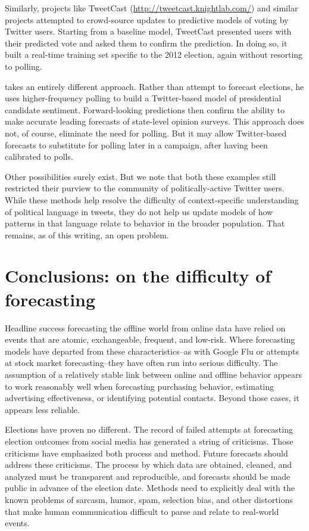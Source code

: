 \documentclass{article}
\begin{document}
Similarly, projects like TweetCast (\url{http://tweetcast.knightlab.com/}) and
similar projects attempted to crowd-source updates to predictive
models of voting by Twitter users. Starting from a baseline model,
TweetCast presented users with their predicted vote and asked them to
confirm the prediction. In doing so, it built a real-time training set
specific to the 2012 election, again without resorting to polling. 

\cite{beauchamp2013} takes an entirely different approach. Rather than
attempt to forecast elections, he uses higher-frequency polling to
build a Twitter-based model of presidential candidate
sentiment. Forward-looking predictions then confirm the ability to
make accurate leading forecasts of state-level opinion surveys. This
approach does not, of course, eliminate the need for polling. But it
may allow Twitter-based forecasts to substitute for polling later in a
campaign, after having been calibrated to polls. 

Other possibilities surely exist. But we note that both these examples
still restricted their purview to the community of politically-active
Twitter users. While these methods help resolve the difficulty of
context-specific understanding of political language in tweets, they
do not help us update models of how patterns in that language relate
to behavior in the broader population. That remains, as of
this writing, an open problem.

\section{Conclusions: on the difficulty of forecasting}
\label{sec:concl-diff-forec}

Headline success forecasting the offline world from online data have
relied on events that are atomic, exchangeable, frequent, and
low-risk. Where forecasting models have departed from these
characteristics--as with Google Flu or attempts at stock market
forecasting--they have often run into serious difficulty. The
assumption of a relatively stable link between online and offline
behavior appears to work reasonably well when forecasting purchasing
behavior, estimating advertising effectiveness, or identifying
potential contacts. Beyond those cases, it appears less reliable.

Elections have proven no different. The record of failed attempts at
forecasting election outcomes from social media has generated a string
of criticisms. Those criticisms have emphasized both process and
method. Future forecasts should address these criticisms. The process
by which data are obtained, cleaned, and analyzed must be transparent
and reproducible, and forecasts should be made public in advance of
the election date. Methods need to explicitly deal with the known
problems of sarcasm, humor, spam, selection bias, and other
distortions that make human communication difficult to parse and
relate to real-world events. 
\end{document}
